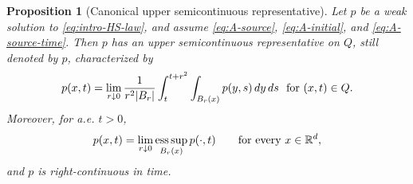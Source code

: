 \documentclass[11pt]{amsart}
\numberwithin{equation}{section}
\numberwithin{figure}{section}
\theoremstyle{plain}
\newtheorem{prop}[thm]{Proposition}
\theoremstyle{definition}
\theoremstyle{remark}
\theoremstyle{plain}
\newcommand{\abs}[1]{\lvert #1 \rvert}
\def\R{\mathbb{R}}
\begin{document}
\begin{prop}[Canonical upper semicontinuous representative]\label{prop:HS-USC-representative}
Let \(p\) be a weak solution to \eqref{eq:intro-HS-law}, and assume
\eqref{eq:A-source}, \eqref{eq:A-initial}, and \eqref{eq:A-source-time}.
Then \(p\) has an
upper semicontinuous representative on $Q$, still denoted
by \(p\), characterized by
\begin{equation}\label{eq:HS-forward-average-representative}
    p(x,t)=\lim_{r\downarrow0}
    \frac{1}{r^2\abs{B_r}}
    \int_t^{t+r^2}\int_{B_r(x)}p(y,s)\,dy\,ds  \,\, \hbox{ for } (x,t)\in Q.
\end{equation}
Moreover, for a.e. \(t>0\),
\begin{equation}\label{eq:HS-spatial-envelope-representative}
    p(x,t)=
    \lim_{r\downarrow0}
    \operatorname*{ess\,sup}_{B_r(x)}p(\cdot,t)
    \qquad\hbox{for every }x\in\R^d,
\end{equation}
and \(p\) is right-continuous in time.
\end{prop}
\end{document}
